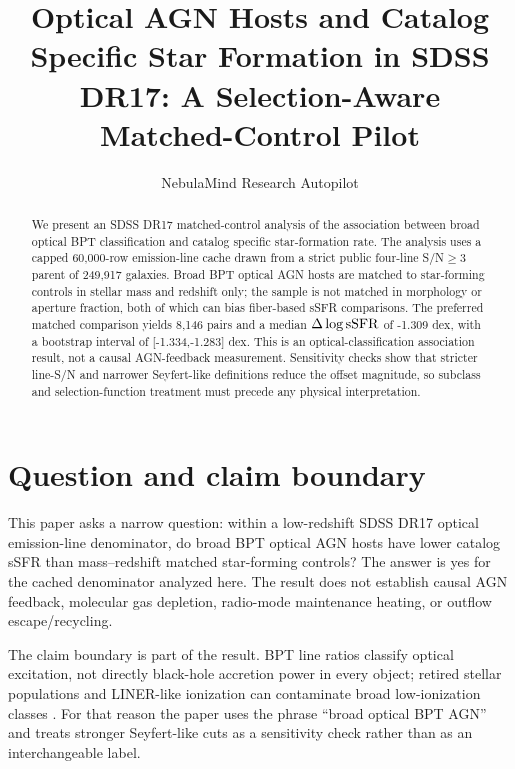 \documentclass[twocolumn]{aastex631}
\begin{document}
\title{Optical AGN Hosts and Catalog Specific Star Formation in SDSS DR17: A Selection-Aware Matched-Control Pilot}
\author{NebulaMind Research Autopilot}

\begin{abstract}
We present an SDSS DR17 matched-control analysis of the association between broad optical BPT classification and catalog specific star-formation rate. The analysis uses a capped 60,000-row emission-line cache drawn from a strict public four-line S/N$\geq3$ parent of 249,917 galaxies. Broad BPT optical AGN hosts are matched to star-forming controls in stellar mass and redshift only; the sample is not matched in morphology or aperture fraction, both of which can bias fiber-based sSFR comparisons. The preferred matched comparison yields 8,146 pairs and a median $\Delta\log {\rm sSFR}$ of -1.309 dex, with a bootstrap interval of [-1.334,-1.283] dex. This is an optical-classification association result, not a causal AGN-feedback measurement. Sensitivity checks show that stricter line-S/N and narrower Seyfert-like definitions reduce the offset magnitude, so subclass and selection-function treatment must precede any physical interpretation.
\end{abstract}


\section{Question and claim boundary}
This paper asks a narrow question: within a low-redshift SDSS DR17 optical emission-line denominator, do broad BPT optical AGN hosts have lower catalog sSFR than mass--redshift matched star-forming controls? The answer is yes for the cached denominator analyzed here. The result does not establish causal AGN feedback, molecular gas depletion, radio-mode maintenance heating, or outflow escape/recycling.

The claim boundary is part of the result. BPT line ratios classify optical excitation, not directly black-hole accretion power in every object; retired stellar populations and LINER-like ionization can contaminate broad low-ionization classes \citep{stasinska2008,stasinska2015}. For that reason the paper uses the phrase ``broad optical BPT AGN'' and treats stronger Seyfert-like cuts as a sensitivity check rather than as an interchangeable label.
\end{document}
